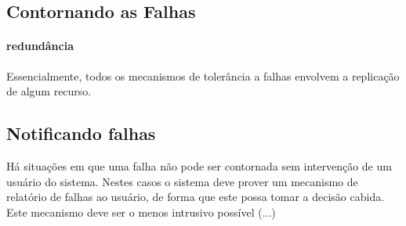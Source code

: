 \subsection{Contornando as Falhas} %
\label{sub:contornando_as_falhas}

\paragraph{redundância} %
\label{par:redundancia}

Essencialmente, todos os mecanismos de tolerância a falhas envolvem a replicação de algum recurso.



\subsection{Notificando falhas} %
\label{sub:notificando_falhas}

Há situações em que uma falha não pode ser contornada sem intervenção de um usuário do sistema. Nestes casos o sistema deve prover um mecanismo de relatório de falhas ao usuário, de forma que este possa tomar a decisão cabida. Este mecanismo deve ser o menos intrusivo possível (...)

